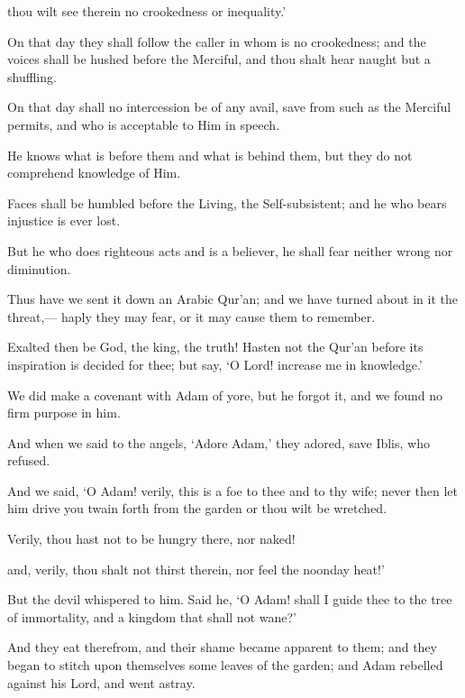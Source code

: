 \documentclass[fontsize=14pt, letterpaper, notitlepage, openany, DIV=12]{scrbook} %
\begin{document}
\noindent[20:107]
thou wilt see therein no crookedness or inequality.'

\noindent[20:108]
On that day they shall follow the caller in whom is no crookedness; and the voices shall
be hushed before the Merciful, and thou shalt hear naught but a shuffling.

\noindent[20:109]
On that day shall no intercession be of any avail, save from such as the Merciful permits,
and who is acceptable to Him in speech.

\noindent[20:110]
He knows what is before them and what is behind them, but they do not comprehend
knowledge of Him.

\noindent[20:111]
Faces shall be humbled before the Living, the Self-subsistent; and he who bears injustice
is ever lost.

\noindent[20:112]
But he who does righteous acts and is a believer, he shall fear neither wrong nor
diminution.

\noindent[20:113]
Thus have we sent it down an Arabic Qur'an; and we have turned about in it the threat,---
haply they may fear, or it may cause them to remember.

\noindent[20:114]
Exalted then be God, the king, the truth! Hasten not the Qur'an before its inspiration is
decided for thee; but say, `O Lord! increase me in knowledge.'

\noindent[20:115]
We did make a covenant with Adam of yore, but he forgot it, and we found no firm
purpose in him.

\noindent[20:116]
And when we said to the angels, `Adore Adam,' they adored, save Iblis, who refused.

\noindent[20:117]
And we said, `O Adam! verily, this is a foe to thee and to thy wife; never then let him
drive you twain forth from the garden or thou wilt be wretched.

\noindent[20:118]
Verily, thou hast not to be hungry there, nor naked!

\noindent[20:119]
and, verily, thou shalt not thirst therein, nor feel the noonday heat!'

\noindent[20:120]
But the devil whispered to him. Said he, `O Adam! shall I guide thee to the tree of
immortality, and a kingdom that shall not wane?'

\noindent[20:121]
And they eat therefrom, and their shame became apparent to them; and they began to
stitch upon themselves some leaves of the garden; and Adam rebelled against his Lord, and went
astray.
\end{document}
